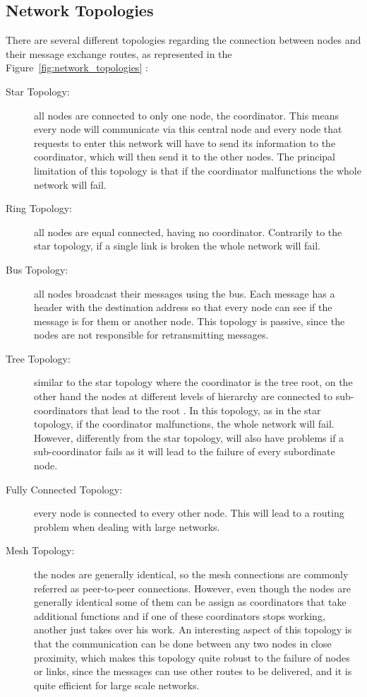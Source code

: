 \subsection{Network Topologies}
\label{subsec:network_topologies}
There are several different topologies regarding the connection between nodes and their message
exchange routes, as represented in the Figure~\ref{fig:network_topologies} \cite{Lewis2004, Yadav2012}:
\begin{description}
      \item[Star Topology:] all nodes are connected to only one node, the coordinator. This
            means every node will communicate via this central node and every node that requests
            to enter this network will have to send its information to the coordinator, which
            will then send it to the other nodes. The principal limitation of this topology is
            that if the coordinator malfunctions the whole network will fail.
      \item[Ring Topology:] all nodes are equal connected, having no coordinator. Contrarily
            to the star topology, if a single link is broken the whole network will fail.
      \item[Bus Topology:] all nodes broadcast their messages using the bus. Each message
            has a header with the destination address so that every node can see if the message
            is for them or another node. This topology is passive, since the nodes are not
            responsible for retransmitting messages.
      \item[Tree Topology:] similar to the star topology where the coordinator is the tree root, on
            the other hand the nodes at different levels of hierarchy are connected to sub-coordinators
            that lead to the root \cite{Shrestha2007}. In this topology, as in the star topology, if
            the coordinator malfunctions, the whole network will fail. However, differently from
            the star topology, will also have problems if a sub-coordinator fails as it will lead
            to the failure of every subordinate node.
      \item[Fully Connected Topology:] every node is connected to every other node. This will
            lead to a routing problem when dealing with large networks.
      \item[Mesh Topology:] the nodes are generally identical, so the mesh connections are
            commonly referred as peer-to-peer connections. However, even though the nodes are
            generally identical some of them can be assign as coordinators that take additional
            functions and if one of these coordinators stops working, another just takes over his
            work. An interesting aspect of this topology is that the communication can be
            done between any two nodes in close proximity, which makes this topology quite
            robust to the failure of nodes or links, since the messages can use other routes to be
            delivered, and it is quite efficient for large scale networks.
\end{description}

